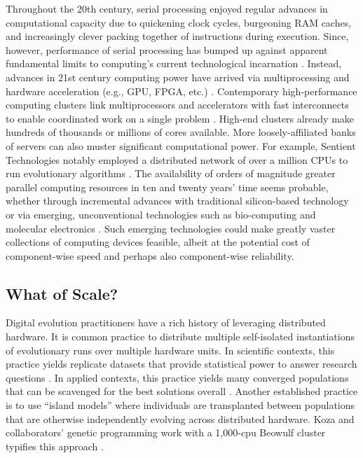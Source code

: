 Throughout the 20th century, serial processing enjoyed regular advances in computational capacity due to quickening clock cycles, burgeoning RAM caches, and increasingly clever packing together of instructions during execution.
Since, however, performance of serial processing has bumped up against apparent fundamental limits to computing’s current technological incarnation \cite{sutter2005free}.
Instead, advances in 21st century computing power have arrived via multiprocessing \cite[p.~55]{hennessy2011computer} and hardware acceleration (e.g., GPU, FPGA, etc.) \cite{che2008accelerating}.
Contemporary high-performance computing clusters link multiprocessors and accelerators with fast interconnects to enable coordinated work on a single problem \cite[p.~436]{hennessy2011computer}.
High-end clusters already make hundreds of thousands or millions of cores available. More loosely-affiliated banks of servers can also muster significant computational power.
For example, Sentient Technologies notably employed a distributed network of over a million CPUs to run evolutionary algorithms \cite{miikkulainen2019evolving}.
The availability of orders of magnitude greater parallel computing resources in ten and twenty years’ time seems probable, whether through incremental advances with traditional silicon-based technology or via emerging, unconventional technologies such as bio-computing \cite{benenson2009biocomputers} and molecular electronics \cite{xiang2016molecular}.
Such emerging technologies could make greatly vaster collections of computing devices feasible, albeit at the potential cost of component-wise speed \cite{bonnet2013amplifying, ellenbogen2000architectures} and perhaps also component-wise reliability.

\subsection{What of Scale?}

Digital evolution practitioners have a rich history of leveraging distributed hardware.
It is common practice to distribute multiple self-isolated instantiations of evolutionary runs over multiple hardware units.
In scientific contexts, this practice yields replicate datasets that provide statistical power to answer research questions \cite{dolson2017spatial}.
In applied contexts, this practice yields many converged populations that can be scavenged for the best solutions overall \cite{hornby2006automated}.
Another established practice is to use ``island models'' where individuals are transplanted between populations that are otherwise independently evolving across distributed hardware.
Koza and collaborators’ genetic programming work with a 1,000-cpu Beowulf cluster typifies this approach \cite{bennett1999building}.


